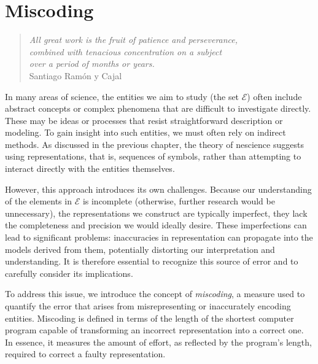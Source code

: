 %
%


\chapter{Miscoding}
\label{chap:Miscoding}

\begin{quote}
    \begin{flushright}
        \emph{All great work is the fruit of patience and perseverance,\\
            combined with tenacious concentration on a subject\\
            over a period of months or years.}\\
        Santiago Ramón y Cajal
    \end{flushright}
\end{quote}
\bigskip

In many areas of science, the entities we aim to study (the set $\mathcal{E}$) often include abstract concepts or complex phenomena that are difficult to investigate directly. These may be ideas or processes that resist straightforward description or modeling. To gain insight into such entities, we must often rely on indirect methods. As discussed in the previous chapter, the theory of nescience suggests using representations, that is, sequences of symbols, rather than attempting to interact directly with the entities themselves.

However, this approach introduces its own challenges. Because our understanding of the elements in $\mathcal{E}$ is incomplete (otherwise, further research would be unnecessary), the representations we construct are typically imperfect, they lack the completeness and precision we would ideally desire. These imperfections can lead to significant problems: inaccuracies in representation can propagate into the models derived from them, potentially distorting our interpretation and understanding. It is therefore essential to recognize this source of error and to carefully consider its implications.

To address this issue, we introduce the concept of \emph{miscoding}, a measure used to quantify the error that arises from misrepresenting or inaccurately encoding entities. Miscoding is defined in terms of the length of the shortest computer program capable of transforming an incorrect representation into a correct one. In essence, it measures the amount of effort, as reflected by the program's length, required to correct a faulty representation.

